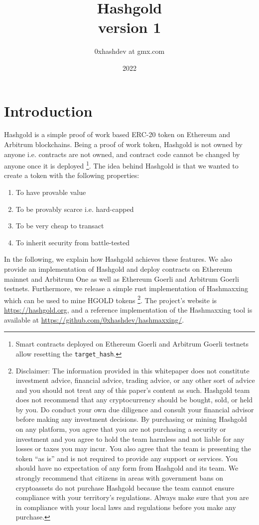 \documentclass[12pt, a4paper]{article}
\title{{\Huge Hashgold} \\
{\large version 1} }
\author{0xhashdev at gmx.com}
\date{2022}
\newcommand{\websitelink}{\href{https://hashgold.org}{https://hashgold.org}}
\newcommand{\githublink}{\href{https://github.com/0xhashdev/hashmaxxing/}{https://github.com/0xhashdev/hashmaxxing/}}
\begin{document}
\maketitle

\section{Introduction}
Hashgold is a simple proof of work based ERC-20 token on Ethereum and Arbitrum blockchains. Being a proof of work token, Hashgold is not owned by anyone i.e. contracts are not owned, and contract code cannot be changed by anyone once it is deployed \footnote{Smart contracts deployed on Ethereum Goerli and Arbitrum Goerli testnets allow resetting the \texttt{target\_hash}.}. The idea behind Hashgold is that we wanted to create a token with the following properties:
\begin{enumerate}
    \item To have provable value
    \item To be provably scarce i.e. hard-capped
    \item To be very cheap to transact
    \item To inherit security from battle-tested 
\end{enumerate}
In the following, we explain how Hashgold achieves these features. We also provide an implementation of Hashgold and deploy contracts on Ethereum mainnet and Arbitrum One as well as Ethereum Goerli and Arbitrum Goerli testnets. Furthermore, we release a simple rust implementation of Hashmaxxing which can be used to mine HGOLD tokens
\footnote{Disclaimer: The information provided in this whitepaper does not constitute investment advice, financial advice, trading advice, or any other sort of advice and you should not treat any of this paper's content as such. 
Hashgold team does not recommend that any cryptocurrency should be bought, sold, or held by you. Do conduct your own due diligence and consult your financial advisor before making any investment decisions.
By purchasing or mining Hashgold on any platform, you agree that you are not purchasing a security or investment and you agree to hold the team harmless and not liable for any losses or taxes you may incur. 
You also agree that the team is presenting the token ``as is'' and is not required to provide any support or services. 
You should have no expectation of any form from Hashgold and its team. 
We strongly recommend that citizens in areas with government bans on cryptoassets do not purchase Hashgold because the team cannot ensure compliance with your territory's regulations. 
Always make sure that you are in compliance with your local laws and regulations before you make any purchase.}.
The project's website is \websitelink, and a reference implementation of the Hashmaxxing tool is available at \githublink.
\end{document}
